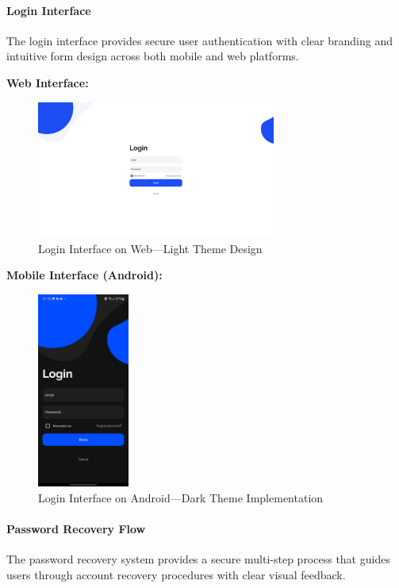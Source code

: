 \paragraph{Login Interface}
The login interface provides secure user authentication with clear branding and intuitive form design across both mobile and web platforms.

\textbf{Web Interface:}
\begin{figure}[!htbp]
    \centering
    \includegraphics[width=0.7\textwidth]{figures/ui/login_web.png}
    \caption{Login Interface on Web---Light Theme Design}\label{fig:web_login}
\end{figure}

\textbf{Mobile Interface (Android):}
\begin{figure}[!htbp]
    \centering
    \includegraphics[width=0.27\textwidth]{figures/ui/login_android.jpeg}
    \caption{Login Interface on Android---Dark Theme Implementation}\label{fig:android_login}
\end{figure}

\paragraph{Password Recovery Flow}
The password recovery system provides a secure multi-step process that guides users through account recovery procedures with clear visual feedback.

